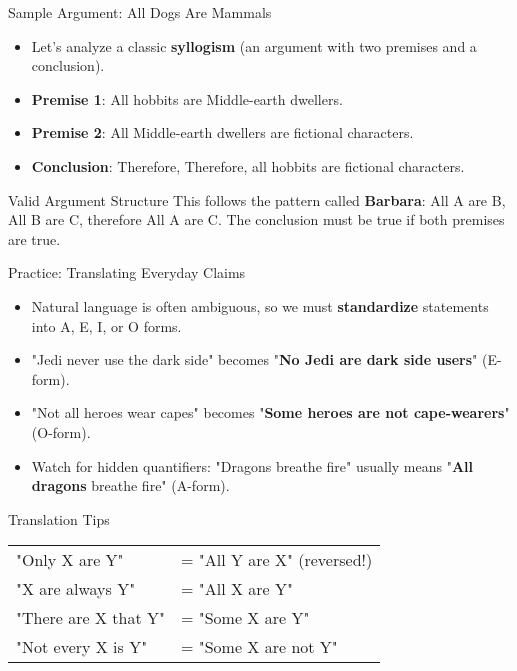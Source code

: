 \documentclass{beamer}
\begin{document}
	\begin{frame}{Sample Argument: All Dogs Are Mammals}
		\begin{itemize}
			\item Let's analyze a classic \textbf{syllogism} (an argument with two premises and a conclusion).
			\item \textbf{Premise 1}: All hobbits are Middle-earth dwellers.
			\item \textbf{Premise 2}: All Middle-earth dwellers are fictional characters.
			\item \textbf{Conclusion}: Therefore, Therefore, all hobbits are fictional characters.
		\end{itemize}
		
		\begin{alertblock}{Valid Argument Structure}
			This follows the pattern called \textbf{Barbara}: All A are B, All B are C, therefore All A are C. The conclusion must be true if both premises are true.
		\end{alertblock}
	\end{frame}
	
	\begin{frame}{Practice: Translating Everyday Claims}
		\begin{itemize}
			\item Natural language is often ambiguous, so we must \textbf{standardize} statements into A, E, I, or O forms.
			\item "Jedi never use the dark side" becomes "\textbf{No Jedi are dark side users}" (E-form).
			\item "Not all heroes wear capes" becomes "\textbf{Some heroes are not cape-wearers}" (O-form).
			\item Watch for hidden quantifiers: "Dragons breathe fire" usually means "\textbf{All dragons} breathe fire" (A-form).
		\end{itemize}
		
		\begin{block}{Translation Tips}
			\begin{tabular}{ll}
				"Only X are Y" & = "All Y are X" (reversed!) \\
				"X are always Y" & = "All X are Y" \\
				"There are X that Y" & = "Some X are Y" \\
				"Not every X is Y" & = "Some X are not Y"
			\end{tabular}
		\end{block}
	\end{frame}
	
\end{document}
